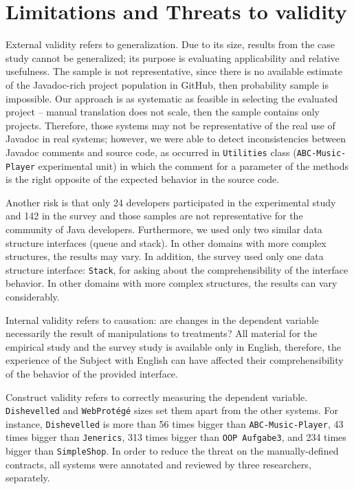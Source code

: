 \section{Limitations and Threats to validity}
\label{sec:CaseStudyThreats}

External validity refers to generalization. Due to its size, results from the
case study cannot be generalized; its purpose is evaluating applicability and relative usefulness.
The sample is not representative, since there is no available estimate of the Javadoc-rich project
population in GitHub, then probability sample is impossible.
Our approach is as systematic as feasible in selecting the evaluated project -- manual translation
does not scale, then the sample contains only \totalSystems{} projects.
Therefore, those systems may not be representative of the real use of Javadoc in real systems; however, we were able
to detect inconsistencies between Javadoc comments and source code, as occurred in
\texttt{Utilities} class (\texttt{ABC-Music-Player} experimental unit) in which the comment for a
parameter of the methods is the right opposite of the expected behavior in the source code.

Another risk is that only 24 developers participated in the experimental study
and 142 in the survey and those samples are not representative for the community
of Java developers. Furthermore, we used only two similar data structure interfaces (queue and stack). In other domains with more complex structures, the results
may vary. In addition, the survey used only one data structure interface:
\texttt{Stack}, for asking about the comprehensibility of the interface behavior.
In other domains with more complex structures, the results can vary considerably.


Internal validity refers to causation: are changes in the dependent variable
necessarily the result of manipulations to treatments? All material for the
empirical study and the survey study is available only in English, therefore,
the experience of the Subject with English can have affected their
comprehensibility of the behavior of the provided interface.

Construct validity refers to correctly measuring the
dependent variable. \texttt{Dishevelled} and
\texttt{WebProt\'{e}g\'{e}} sizes set them apart from the other systems.
For instance, \texttt{Dishevelled} is more than 56 times bigger than \texttt{ABC-Music-Player}, 43
times bigger than \texttt{Jenerics}, 313 times bigger than \texttt{OOP Aufgabe3}, and 234 times
bigger than \texttt{SimpleShop}.
In order to reduce the threat on the manually-defined contracts,
all systems were annotated and reviewed by three researchers, separately.

